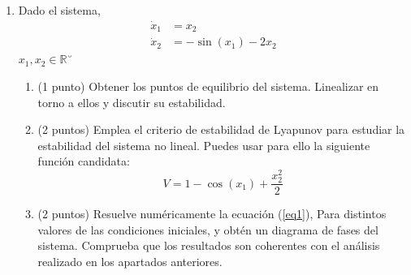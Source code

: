 \documentclass[10pt,a4paper]{article}
\begin{document}
\begin{enumerate}
\begin{enumerate}
\item (1.5 puntos) Diseña un estimador de modo que sus autovalores estén desplazados cuatro unidades hacia a la izquierda respecto a los polos del sistema controlado diseñado en el apartado (\ref{b}). Emplea el estimador para realimentar y controlar el sistema. Repite el calculo realizado en el apartado (\ref{c}) pero llevando ahora $x_3=4$. Considera nulas las condiciones iniciales del estimador $\hat{x}_i=0$.

\end{enumerate}


\item Dado el sistema,
\begin{equation}\label{eq1}
\begin{split}
\dot x_1 &= x_2\\
 \dot x_2 &= -\sin(x_1) - 2x_2
\end{split}
\end{equation}
$x_1,x_2 \in \mathbb{R}$˘
\begin{enumerate}
\item (1 punto) Obtener los puntos de equilibrio del sistema. Linealizar en torno a ellos y discutir su estabilidad.
\item \label{apb} (2 puntos)  Emplea el criterio de estabilidad de Lyapunov para  estudiar la estabilidad del sistema no lineal. Puedes usar para ello la siguiente función candidata:
\begin{equation*}
V = 1-\cos(x_1)+ \frac{x_2^2}{2}
\end{equation*}

\item (2 puntos) Resuelve numéricamente la ecuación (\ref{eq1}), Para distintos valores de las condiciones iniciales, y obtén un diagrama de fases del sistema. Comprueba que los resultados son coherentes con el análisis realizado en los apartados anteriores.
\end{enumerate}
\end{enumerate}
\end{document}
